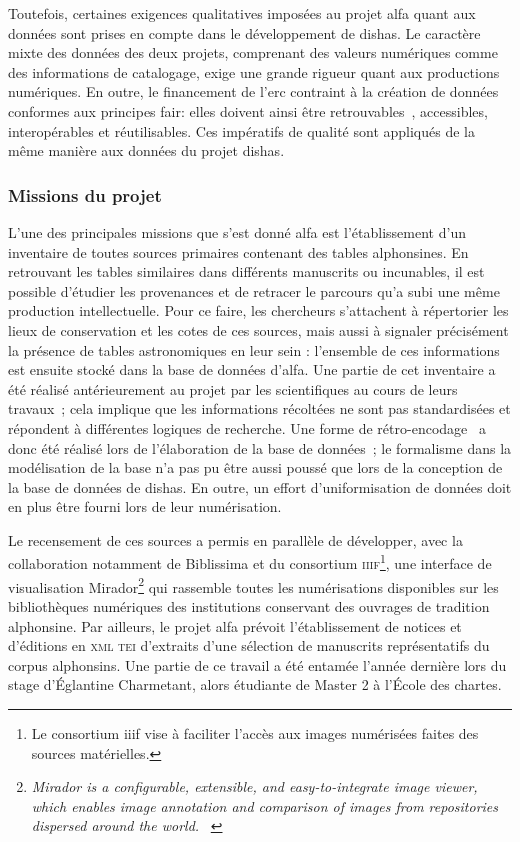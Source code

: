 \documentclass[a4paper,12pt,twoside]{book}
\newcommand{\eng}{\emph}
\newcommand{\g}[1]{\og#1~\fg}
\newcommand{\dishas}{\gls{dishas}\xspace}
\newcommand{\alfa}{\gls{alfa}\xspace}
\newcommand{\erc}{\gls{erc}\xspace}
\newcommand{\fair}{\gls{fair}\xspace}
\newcommand{\iiif}{\gls{iiif}\xspace}
\begin{document}
Toutefois, certaines exigences qualitatives imposées au projet \alfa quant aux données sont prises en compte dans le développement de \dishas. Le caractère mixte des données des deux projets, comprenant des valeurs numériques comme des informations de catalogage, exige une grande rigueur quant aux productions numériques. En outre, le financement de l'\erc contraint à la création de données conformes aux principes \fair: elles doivent ainsi être \g{retrouvables}, accessibles, interopérables et réutilisables. Ces impératifs de qualité sont appliqués de la même manière aux données du projet \dishas.

			\subsubsection{Missions du projet}
L'une des principales missions que s'est donné \alfa est l'établissement d'un inventaire de toutes sources primaires contenant des tables alphonsines. En retrouvant les tables similaires dans différents manuscrits ou incunables, il est possible d'étudier les provenances et de retracer le parcours qu'a subi une même production intellectuelle. Pour ce faire, les chercheurs s'attachent à répertorier les lieux de conservation et les cotes de ces sources, mais aussi à signaler précisément la présence de tables astronomiques en leur sein : l'ensemble de ces informations est ensuite stocké dans la base de données d'\alfa. Une partie de cet inventaire a été réalisé antérieurement au projet par les scientifiques au cours de leurs travaux~; cela implique que les informations récoltées ne sont pas standardisées et répondent à différentes logiques de recherche. Une forme de \g{rétro-encodage} a donc été réalisé lors de l'élaboration de la base de données~; le formalisme dans la modélisation de la base n'a pas pu être aussi poussé que lors de la conception de la base de données de \dishas. En outre, un effort d'uniformisation de données doit en plus être fourni lors de leur numérisation.

Le recensement de ces sources a permis en parallèle de développer, avec la collaboration notamment de Biblissima et du consortium \textsc{iiif}\footnote{Le consortium \iiif vise à faciliter l'accès aux images numérisées faites des sources matérielles.}, une interface de visualisation Mirador\footnote{\g{\eng{Mirador is a configurable, extensible, and easy-to-integrate image viewer, which enables image annotation and comparison of images from repositories dispersed around the world.}} \cite{MiradorHome}} qui rassemble toutes les numérisations disponibles sur les bibliothèques numériques des institutions conservant des ouvrages de tradition alphonsine. Par ailleurs, le projet \alfa prévoit l'établissement de notices et d'éditions en \textsc{xml tei} d'extraits d'une sélection de manuscrits représentatifs du corpus alphonsins. Une partie de ce travail a été entamée l'année dernière lors du stage d'Églantine Charmetant, alors étudiante de Master 2 à l'École des chartes.
\end{document}
